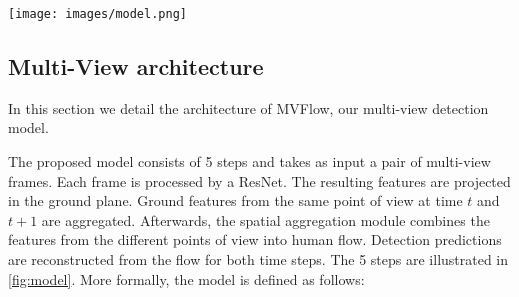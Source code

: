 \documentclass[10pt,twocolumn,letterpaper]{article}
\begin{document}
\begin{figure*}[t]
\begin{center}
\centering\texttt{[image: images/model.png]}
\end{center}
\caption{\textbf{Proposed Multiview Detection Architecture}. Two consecutive sets of multi-view frames are transformed into human flow $f^{t,t+1}$ 
by the proposed multi-view prediction model.
The human flow is then used to reconstruct detection heatmaps $\ve x^t$ and $\ve x^{t+1}$.
The architecture with parameters $(\mbs \theta_0, \mbs \theta_1, \mbs \theta_2)$ is trained with ground truth detection only.
Blue background boxes are trainable modules (with parameters indicated on top). 
Output dimensions $h=w=128$ is used in the experiments.
}
\label{fig:model}
\end{figure*} 
\subsection{Multi-View architecture}

In this section we detail the architecture of MVFlow, our multi-view detection model.

The proposed model consists of 5 steps and takes as input a pair of multi-view frames. Each frame is processed by a ResNet. The resulting features are projected in the ground plane. Ground features from the same point of view at time $t$ and $t+1$ are aggregated. Afterwards, the spatial aggregation module combines the features from the different points of view into human flow.
Detection predictions are reconstructed from the flow for both time steps. The 5 steps are illustrated in \cref{fig:model}.
More formally, the model is defined as follows:
\end{document}

